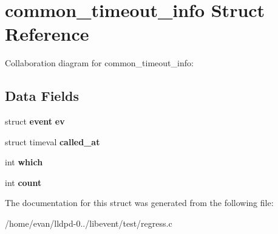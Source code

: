 \section{common\-\_\-timeout\-\_\-info \-Struct \-Reference}
\label{structcommon__timeout__info}


\-Collaboration diagram for common\-\_\-timeout\-\_\-info\-:
\subsection*{\-Data \-Fields}
\begin{DoxyCompactItemize}
\item 
struct {\bf event} {\bfseries ev}\label{structcommon__timeout__info_ace3e34472d1f55b6a831df15ff5e2d9c}

\item 
struct timeval {\bfseries called\-\_\-at}\label{structcommon__timeout__info_a1f6a29ad8192644a0186e3ad045d4f42}

\item 
int {\bfseries which}\label{structcommon__timeout__info_aa2a4dae2a14de4093826005f9bdfd3bb}

\item 
int {\bfseries count}\label{structcommon__timeout__info_ad43c3812e6d13e0518d9f8b8f463ffcf}

\end{DoxyCompactItemize}


\-The documentation for this struct was generated from the following file\-:\begin{DoxyCompactItemize}
\item 
/home/evan/lldpd-\/0../libevent/test/regress.\-c\end{DoxyCompactItemize}
